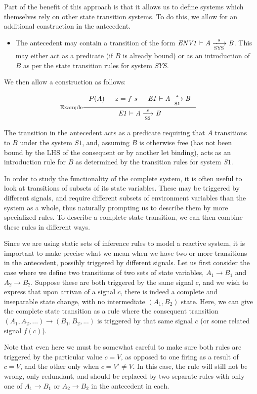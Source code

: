\documentclass[11pt,a4paper]{article}
\newcommand{\var}[1]{\mathit{#1}}
\theoremstyle{definition}
\theoremstyle{remark}
\begin{document}
Part of the benefit of this approach is that it allows us to define systems
which themselves rely on other state transition systems. To do this, we allow
for an additional construction in the antecedent.

\begin{itemize}
\item The antecedent may contain a transition of the form $\tion[ENV1]{SYS}{A}{s}{B}$.
    This may either act as a predicate (if $B$ is already bound) or as an
    introduction of $B$ as per the state transition rules for system $\var{SYS}$.
\end{itemize}

We then allow a construction as follows:

\[
  \inference[Example]
    {P(A) & z = f ~ s & \tion[E1]{S1}{A}{z}{B}}
    {\tion[E1]{S2}{A}{s}{B}}
\]

The transition in the antecedent acts as a predicate requiring that $A$
transitions to $B$ under the system $S1$, and, assuming $B$ is otherwise free
(has not been bound by the LHS of the consequent or by another let binding),
acts as an introduction rule for $B$ as determined by the transition rules for
system $S1$.

In order to study the functionality of the complete system, it is often useful
to look at transitions of subsets of its state variables. These may be triggered
by different signals, and require different subsets of environment variables
than the system as a whole, thus naturally prompting us to describe them
by more specialized rules. To describe a complete state transition, we can
then combine these rules in different ways.

Since we are using static sets of inference rules to model a reactive system,
it is important to make precise what we mean when we have two or more
transitions in the antecedent, possibly triggered by different signals.
Let us first consider the case where we define two transitions of two
sets of state variables,
$A_1 \to B_1$ and $A_2 \to B_2$. Suppose these are both triggered by the same signal $c$,
and we wish to express that upon arrivan of a signal $c$,
there is indeed a complete and inseparable state change, with no intermediate
$(A_1, B_2)$ state. Here, we can give the complete state transition as a
rule where the consequent transition $(A_1, A_2, ...) \to (B_1, B_2, ...)$ is triggered
by that same signal $c$ (or some related signal $f(c)$).

Note that even here we must be somewhat careful to make sure both rules are
triggered by the particular value $c = V$, as opposed to one firing as
a result of $c = V$, and the other only when $c = V' \neq V$. In this case,
the rule will still not be wrong, only redundant, and should be replaced by
two separate rules with only one of $A_1 \to B_1$ or $A_2 \to B_2$ in
the antecedent in each.
\end{document}

